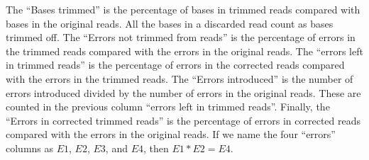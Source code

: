 \documentclass[10pt]{bmc_article}
\newenvironment{bmcformat}{\fussy\setboolean{publ}{true}}{\fussy}
\begin{document}
\begin{bmcformat}



%
%
\label{table:left-introduced}

The ``Bases trimmed'' is the percentage of bases in trimmed reads compared with bases in the original reads.
All the bases in a discarded read count as bases trimmed off.
The ``Errors not trimmed from reads'' is the percentage of errors in the trimmed reads compared with the errors in the original reads.
The ``errors left in trimmed reads'' is the percentage of errors in the corrected reads compared with the errors in the trimmed reads.
The ``Errors introduced'' is the number of errors introduced divided by the number of errors in the original reads.
These are counted in the previous column ``errors left in trimmed reads''.
Finally, the ``Errors in corrected trimmed reads'' is the percentage of errors in corrected reads compared with the errors in the original reads.
If we name the four ``errors'' columns as $E1$, $E2$, $E3$, and $E4$, then $E1 * E2 = E4$.


\end{bmcformat}
\end{document}
